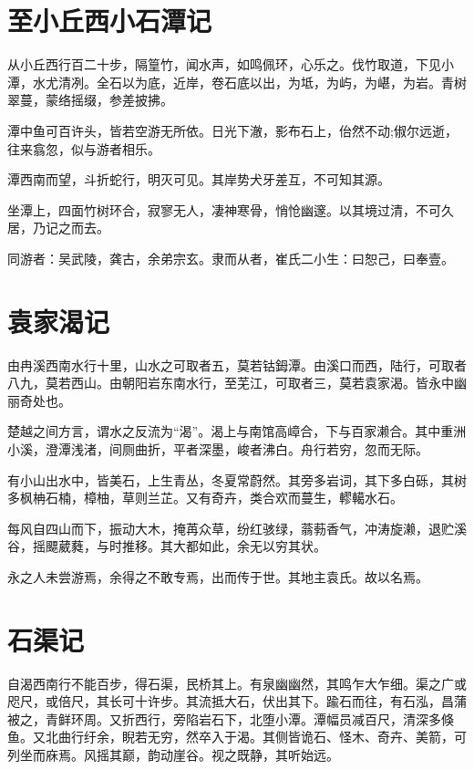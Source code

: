 \documentclass[UTF8,titlepage,oneside]{ctexbook}
\begin{document}
\section*{至小丘西小石潭记}


从小丘西行百二十步，隔篁竹，闻水声，如鸣佩环，心乐之。伐竹取道，下见小潭，水尤清冽。全石以为底，近岸，卷石底以出，为坻，为屿，为嵁，为岩。青树翠蔓，蒙络摇缀，参差披拂。

潭中鱼可百许头，皆若空游无所依。日光下澈，影布石上，佁然不动;俶尔远逝，往来翕忽，似与游者相乐。

潭西南而望，斗折蛇行，明灭可见。其岸势犬牙差互，不可知其源。

坐潭上，四面竹树环合，寂寥无人，凄神寒骨，悄怆幽邃。以其境过清，不可久居，乃记之而去。

同游者：吴武陵，龚古，余弟宗玄。隶而从者，崔氏二小生：曰恕己，曰奉壹。



\section*{袁家渴记}


由冉溪西南水行十里，山水之可取者五，莫若钴鉧潭。由溪口而西，陆行，可取者八九，莫若西山。由朝阳岩东南水行，至芜江，可取者三，莫若袁家渴。皆永中幽丽奇处也。

楚越之间方言，谓水之反流为“渴”。渴上与南馆高嶂合，下与百家濑合。其中重洲小溪，澄潭浅渚，间厕曲折，平者深墨，峻者沸白。舟行若穷，忽而无际。

有小山出水中，皆美石，上生青丛，冬夏常蔚然。其旁多岩词，其下多白砾，其树多枫柟石楠，樟柚，草则兰芷。又有奇卉，类合欢而蔓生，轇轕水石。

每风自四山而下，振动大木，掩苒众草，纷红骇绿，蓊葧香气，冲涛旋濑，退贮溪谷，摇飃葳蕤，与时推移。其大都如此，余无以穷其状。

永之人未尝游焉，余得之不敢专焉，出而传于世。其地主袁氏。故以名焉。



\section*{石渠记}


自渴西南行不能百步，得石渠，民桥其上。有泉幽幽然，其鸣乍大乍细。渠之广或咫尺，或倍尺，其长可十许步。其流抵大石，伏出其下。踰石而往，有石泓，昌蒲被之，青鲜环周。又折西行，旁陷岩石下，北堕小潭。潭幅员减百尺，清深多倏鱼。又北曲行纡余，睨若无穷，然卒入于渴。其侧皆诡石、怪木、奇卉、美箭，可列坐而庥焉。风摇其巅，韵动崖谷。视之既静，其听始远。
\end{document}
